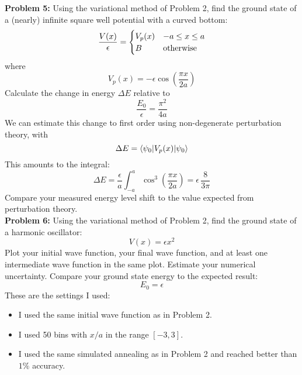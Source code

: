 \documentclass[12pt]{article}
\begin{document}
\noindent
{\bf Problem 5:}  Using the variational method of Problem 2, find the ground state of a (nearly) infinite square well potential with a curved bottom:
$$\frac{V(x)}{\epsilon} = \begin{cases}
V_p(x) & -a \leq x \leq a \\
B     & {\rm otherwise} \\
\end{cases}
$$
where
$$V_p(x) = -\epsilon \cos\left(\frac{\pi x}{2 a}\right)$$
Calculate the change in energy $\Delta E$ relative to 
$$\frac{E_0}{\epsilon} = \frac{\pi^2}{4a} $$
We can estimate this change to first order using non-degenerate perturbation theory, with
$$\Delta E = \braket{\psi_0| V_p(x) | \psi_0}$$
This amounts to the integral:
$$\Delta E = \frac{\epsilon}{a} \int_{-a}^{a} \cos^3\left(\frac{\pi x}{2 a}\right) = \epsilon \, \frac{8}{3 \pi}$$
Compare your measured energy level shift to the value expected from perturbation theory.\\

\noindent
{\bf Problem 6:}  Using the variational method of Problem 2, find the ground state of a harmonic oscillator:
$$V(x) = \epsilon x^2$$
Plot your initial wave function, your final wave function, and at least one intermediate wave function in the same plot. Estimate your numerical uncertainty.  Compare your ground state energy to the expected result:
$$E_0 = \epsilon$$
These are the settings I used:
\begin{itemize}
\item I used the same initial wave function as in Problem 2.
\item I used 50 bins with $x/a$ in the range $[-3, 3]$.
\item I used the same simulated annealing as in Problem 2 and reached better than $1\%$ accuracy.
\end{itemize}
\end{document}
